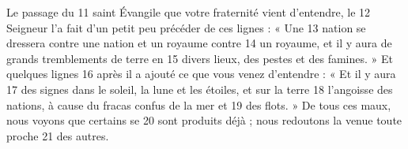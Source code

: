 Le passage du	 
11	 	saint Évangile que votre fraternité vient d'entendre, le	 
12	 	Seigneur l'a fait d'un petit peu précéder de ces lignes : « Une	 
13	 	nation se dressera contre une nation et un royaume contre	 
14	 	un royaume, et il y aura de grands tremblements de terre en	 
15	 	divers lieux, des pestes et des famines. » Et quelques lignes	 
16	 	après il a ajouté ce que vous venez d'entendre : « Et il y aura	 
17	 	des signes dans le soleil, la lune et les étoiles, et sur la terre	 
18	 	l'angoisse des nations, à cause du fracas confus de la mer et	 
19	 	des flots. » De tous ces maux, nous voyons que certains se	 
20	 	sont produits déjà ; nous redoutons la venue toute proche	 
21	 	des autres.
